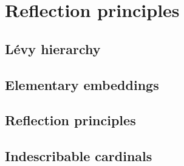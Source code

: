 
\section{Reflection principles}%
\label{sec:reflection_principles}

\subsection{Lévy hierarchy}%
\label{sub:levy_hierarchy}

\subsection{Elementary embeddings}%
\label{sub:elementary_embeddings}

\subsection{Reflection principles}%
\label{sub:reflection_principles}

\subsection{Indescribable cardinals}%
\label{sub:indescribable_cardinals}

